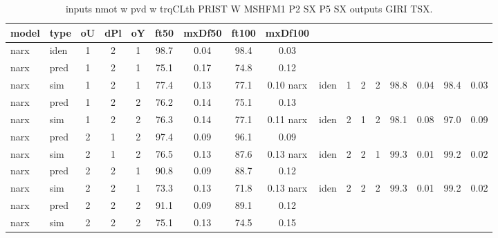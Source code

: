 \begin{center} 
\begin{longtable}{ll|ccc|cc|cc} 
\caption[inputs nmot w pvd w trqCLth PRIST W MSHFM1 P2 SX P5 SX   outputs GIRI TSX]{inputs nmot w pvd w trqCLth PRIST W MSHFM1 P2 SX P5 SX   outputs GIRI TSX.} 
\label{tab:inputs_nmot_w_pvd_w_trqCLth_PRIST_W_MSHFM1_P2_SX_P5_SX___outputs_GIRI_TSX} 
\hline 
  model & type & oU & dPl & oY & ft50 & mxDf50 & ft100 & mxDf100 \\ 
 \hline 
narx & iden & 1 & 2 & 1 & 98.7 & 0.04 & 98.4 & 0.03 \\ 
narx & pred & 1 & 2 & 1 & 75.1 & 0.17 & 74.8 & 0.12 \\ 
narx & sim  & 1 & 2 & 1 & 77.4 & 0.13 & 77.1 & 0.10 
 \hline 
narx & iden & 1 & 2 & 2 & 98.8 & 0.04 & 98.4 & 0.03 \\ 
narx & pred & 1 & 2 & 2 & 76.2 & 0.14 & 75.1 & 0.13 \\ 
narx & sim  & 1 & 2 & 2 & 76.3 & 0.14 & 77.1 & 0.11 
 \hline 
narx & iden & 2 & 1 & 2 & 98.1 & 0.08 & 97.0 & 0.09 \\ 
narx & pred & 2 & 1 & 2 & 97.4 & 0.09 & 96.1 & 0.09 \\ 
narx & sim  & 2 & 1 & 2 & 76.5 & 0.13 & 87.6 & 0.13 
 \hline 
narx & iden & 2 & 2 & 1 & 99.3 & 0.01 & 99.2 & 0.02 \\ 
narx & pred & 2 & 2 & 1 & 90.8 & 0.09 & 88.7 & 0.12 \\ 
narx & sim  & 2 & 2 & 1 & 73.3 & 0.13 & 71.8 & 0.13 
 \hline 
narx & iden & 2 & 2 & 2 & 99.3 & 0.01 & 99.2 & 0.02 \\ 
narx & pred & 2 & 2 & 2 & 91.1 & 0.09 & 89.1 & 0.12 \\ 
narx & sim  & 2 & 2 & 2 & 75.1 & 0.13 & 74.5 & 0.15 
 \hline 
\end{longtable} 
\end{center}